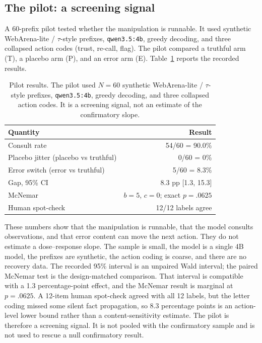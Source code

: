 \documentclass[11pt,a4paper]{article}
\begin{document}
\subsection{The pilot: a screening signal}
\label{sec:pilot}
A 60-prefix pilot tested whether the manipulation is runnable. It used synthetic WebArena-lite /
$\tau$-style prefixes, \texttt{qwen3.5:4b}, greedy decoding, and three collapsed action codes
(trust, re-call, flag). The pilot compared a truthful arm (T), a placebo arm (P), and an error arm
(E). Table~\ref{tab:pilot} reports the recorded results.

\begin{table}[h]
\centering
\small
\caption{Pilot results. The pilot used $N=60$ synthetic WebArena-lite / $\tau$-style prefixes,
\texttt{qwen3.5:4b}, greedy decoding, and three collapsed action codes. It is a screening signal,
not an estimate of the confirmatory slope.}
\label{tab:pilot}
\begin{tabular}{@{}lr@{}}
\toprule
Quantity & Result \\
\midrule
Consult rate & 54/60 = 90.0\% \\
Placebo jitter (placebo vs truthful) & 0/60 = 0\% \\
Error switch (error vs truthful) & 5/60 = 8.3\% \\
Gap, 95\% CI & 8.3 pp [1.3, 15.3] \\
McNemar & $b=5$, $c=0$; exact $p=.0625$ \\
Human spot-check & 12/12 labels agree \\
\bottomrule
\end{tabular}
\end{table}

These numbers show that the manipulation is runnable, that the model consults observations, and
that error content can move the next action. They do not estimate a dose--response slope. The
sample is small, the model is a single 4B model, the prefixes are synthetic, the action coding is
coarse, and there are no recovery data. The recorded 95\% interval is an unpaired Wald interval;
the paired McNemar test is the design-matched comparison. That interval is compatible with a 1.3
percentage-point effect, and the McNemar result is marginal at $p=.0625$. A 12-item human
spot-check agreed with all 12 labels, but the letter coding missed some silent fact propagation, so
8.3 percentage points is an action-level lower bound rather than a content-sensitivity estimate.
The pilot is therefore a screening signal. It is not pooled with the confirmatory sample and is not
used to rescue a null confirmatory result.
\end{document}
